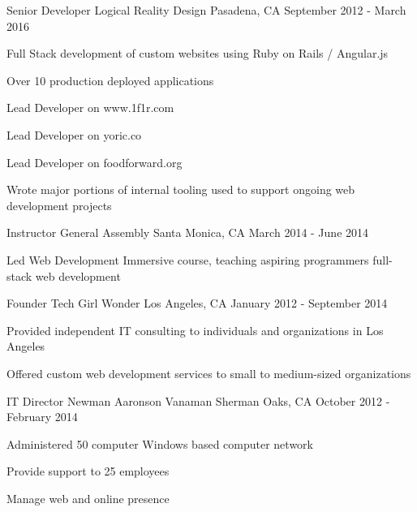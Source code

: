 \begin{cventries}
  \cventry
    {Senior Developer} %
    {Logical Reality Design} %
    {Pasadena, CA} %
    {September 2012 - March 2016} %
    {
      \begin{cvitems} %
        \item {Full Stack development of custom websites using Ruby on Rails / Angular.js}
        \item {Over 10 production deployed applications}
        \item {Lead Developer on www.1f1r.com}
        \item {Lead Developer on yoric.co}
        \item {Lead Developer on foodforward.org}
        \item {Wrote major portions of internal tooling used to support ongoing web development projects}
      \end{cvitems}
    }
  \cventry
    {Instructor} %
    {General Assembly} %
    {Santa Monica, CA} %
    {March 2014 - June 2014} %
    {
      \begin{cvitems} %
        \item {Led Web Development Immersive course, teaching aspiring programmers full-stack web development}
      \end{cvitems}
    }
  \cventry
    {Founder} %
    {Tech Girl Wonder} %
    {Los Angeles, CA} %
    {January 2012 - September 2014} %
    {
      \begin{cvitems} %
        \item {Provided independent IT consulting to individuals and organizations in Los Angeles}
        \item {Offered custom web development services to small to medium-sized organizations}
      \end{cvitems}
    }

  \cventry
    {IT Director} %
    {Newman Aaronson Vanaman} %
    {Sherman Oaks, CA} %
    {October 2012 - February 2014} %
    {
      \begin{cvitems} %
        \item {Administered 50 computer Windows based computer network}
        \item {Provide support to 25 employees}
        \item {Manage web and online presence}
      \end{cvitems}
    }


\end{cventries}
